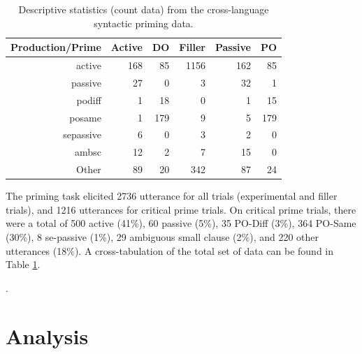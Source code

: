 \begin{table}[htbp]
  \centering
  \caption{Descriptive statistics (count data) from the cross-language syntactic priming data.}
    \begin{tabular}{rrrrrr}
    \toprule
    Production/Prime & Active & DO    & Filler & Passive & PO \\
    \midrule
    active & 168   & 85    & 1156  & 162   & 85 \\
    passive & 27    & 0     & 3     & 32    & 1 \\
    podiff & 1     & 18    & 0     & 1     & 15 \\
    posame & 1     & 179   & 9     & 5     & 179 \\
    sepassive & 6     & 0     & 3     & 2     & 0 \\
    ambsc & 12    & 2     & 7     & 15    & 0 \\
    Other & 89    & 20    & 342   & 87    & 24 \\
    \bottomrule
    \end{tabular}%
  \label{tab:priming.descriptives}%
\end{table}%


The priming task elicited 2736 utterance for all trials (experimental and filler trials), and 1216 utterances for critical prime trials. On critical prime trials, there were a total of 500 active (41\%), 60 passive (5\%), 35 PO-Diff (3\%), 364 PO-Same (30\%), 8 se-passive (1\%), 29 ambiguous small clause (2\%), and 220 other utterances (18\%). A cross-tabulation of the total set of data can be found in Table \ref{tab:priming.descriptives}. 

. 

\section{Analysis}
\label{analysis}

